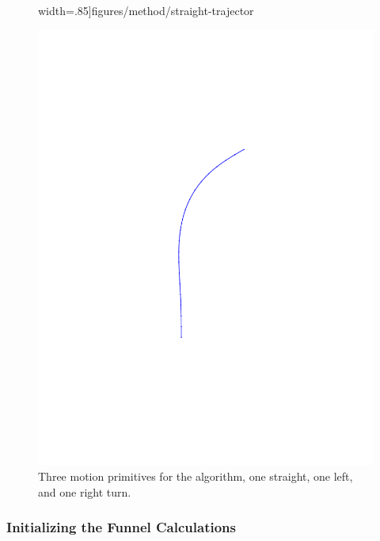 \begin{figure}
\begin{minipage}[c]{0.3\textwidth}
    width=.85\textwidth]{figures/method/straight-trajector}
  \end{minipage}
  \hfill
  \begin{minipage}[c]{0.3\textwidth}
    \includegraphics[trim={5cm 5cm 5cm 5cm},
    width=.85\textwidth]{figures/method/right-trajector}
  \end{minipage}
  \caption[Three motion primitives for the \rrtfunnel{} algorithm]{Three motion primitives for the \rrtfunnel{} algorithm, one straight,
    one left, and one right turn.}
  \label{fig:initial-trajectories}
\end{figure}

\subsubsection{Initializing the Funnel Calculations}
\label{subsec:initializing-tvlqr}

